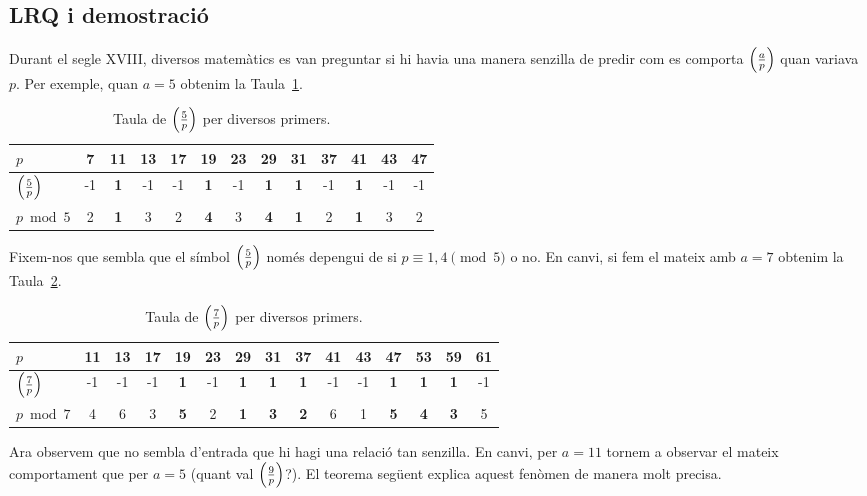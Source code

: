 \subsection{LRQ i demostració}

Durant el segle XVIII, diversos matemàtics es van preguntar si hi havia una manera senzilla de predir com es comporta $\left(\frac{a}{p}\right)$ quan variava $p$. Per exemple, quan $a=5$ obtenim la Taula~\ref{taula:lrq}.
\begin{table}[ht!]
\centering
\begin{tabular}{lcccccccccccc}

\toprule
    $p$ & 7  & \textbf{11} & 13 & 17 & \textbf{19} & 23 & \textbf{29} & \textbf{31} & 37 & \textbf{41} & 43 & 47\\
    \midrule
    $\left(\frac{5}{p}\right)$& -1& \textbf{1}& -1 & -1 & \textbf{1} & -1 & \textbf{1} & \textbf{1} & -1 & \textbf{1} & -1 & -1\\
    $p\bmod 5$ & 2 & \textbf{1} & 3 & 2 & \textbf{4} & 3 &\textbf{4} & \textbf{1} & 2 &\textbf{1} & 3 & 2\\
    \bottomrule
\end{tabular}
\caption{\label{taula:lrq}Taula de $\left(\frac{5}{p}\right)$ per diversos primers.}

\end{table}

Fixem-nos que sembla que el símbol $\left(\frac{5}{p}\right)$ només depengui de si ${p\equiv 1,4\pmod{5}}$ o no. En canvi, si fem el mateix amb $a=7$ obtenim la Taula~\ref{taula:lrq2}.
\begin{table}[ht!]
\centering

\begin{tabular}{lcccccccccccccc}
\toprule
    $p$ & 11 & 13 & 17 & \textbf{19} & 23 & \textbf{29} & \textbf{31} & \textbf{37} & 41 & 43 & \textbf{47}&\textbf{53}&\textbf{59}&61\\
\midrule
    $\left(\frac{7}{p}\right)$& -1& -1& -1 & \textbf{1} & -1 & \textbf{1} & \textbf{1} & \textbf{1} & -1 & -1 & \textbf{1} & \textbf{1} & \textbf{1}&-1\\
    $p\bmod 7$ & 4 & 6 & 3 & \textbf{5} & 2& \textbf{1} & \textbf{3} & \textbf{2} & 6 & 1 & \textbf{5} & \textbf{4} & \textbf{3}&5\\
\bottomrule
\end{tabular}

\caption{\label{taula:lrq2}Taula de $\left(\frac{7}{p}\right)$ per diversos primers.}

\end{table}
Ara observem que no sembla d'entrada que hi hagi una relació tan senzilla. En canvi, per $a=11$ tornem a observar el mateix comportament que per $a=5$ (quant val $\left(\frac{9}{p}\right)$?). El teorema següent explica aquest fenòmen de manera molt precisa.

